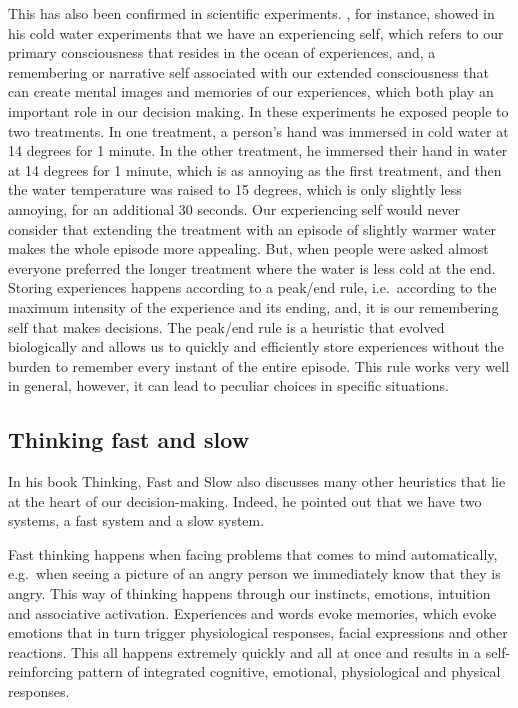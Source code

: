 \documentclass[
  11pt,
]{book}
\begin{document}
This has also been confirmed in scientific experiments. \citet{Kahneman2012}, for instance, showed in his cold water experiments that we have an experiencing self, which refers to our primary consciousness that resides in the ocean of experiences, and, a remembering or narrative self associated with our extended consciousness that can create mental images and memories of our experiences, which both play an important role in our decision making. In these experiments he exposed people to two treatments. In one treatment, a person's hand was immersed in cold water at 14 degrees for 1 minute. In the other treatment, he immersed their hand in water at 14 degrees for 1 minute, which is as annoying as the first treatment, and then the water temperature was raised to 15 degrees, which is only slightly less annoying, for an additional 30 seconds. Our experiencing self would never consider that extending the treatment with an episode of slightly warmer water makes the whole episode more appealing. But, when people were asked almost everyone preferred the longer treatment where the water is less cold at the end. Storing experiences happens according to a peak/end rule, i.e.~according to the maximum intensity of the experience and its ending, and, it is our remembering self that makes decisions. The peak/end rule is a heuristic that evolved biologically and allows us to quickly and efficiently store experiences without the burden to remember every instant of the entire episode. This rule works very well in general, however, it can lead to peculiar choices in specific situations.

\hypertarget{thinking-fast-and-slow}{%
\subsection{Thinking fast and slow}\label{thinking-fast-and-slow}}

In his book Thinking, Fast and Slow \citet{Kahneman2012} also discusses many other heuristics that lie at the heart of our decision-making. Indeed, he pointed out that we have two systems, a fast system and a slow system.

Fast thinking happens when facing problems that comes to mind automatically, e.g.~when seeing a picture of an angry person we immediately know that they is angry. This way of thinking happens through our instincts, emotions, intuition and associative activation. Experiences and words evoke memories, which evoke emotions that in turn trigger physiological responses, facial expressions and other reactions. This all happens extremely quickly and all at once and results in a self-reinforcing pattern of integrated cognitive, emotional, physiological and physical responses.
\end{document}
